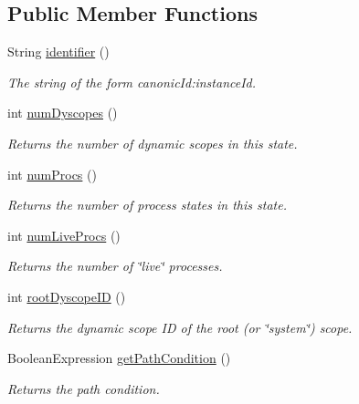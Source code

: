 \subsection*{Public Member Functions}
\begin{DoxyCompactItemize}
\item 
String \hyperlink{interfaceedu_1_1udel_1_1cis_1_1vsl_1_1civl_1_1state_1_1IF_1_1State_a0f39b4dd994e588d9c6d371e1bc7ec95}{identifier} ()
\begin{DoxyCompactList}\small\item\em The string of the form canonic\+Id\+:instance\+Id. \end{DoxyCompactList}\item 
int \hyperlink{interfaceedu_1_1udel_1_1cis_1_1vsl_1_1civl_1_1state_1_1IF_1_1State_a26c87296927d9183e682fc2f1498419d}{num\+Dyscopes} ()
\begin{DoxyCompactList}\small\item\em Returns the number of dynamic scopes in this state. \end{DoxyCompactList}\item 
int \hyperlink{interfaceedu_1_1udel_1_1cis_1_1vsl_1_1civl_1_1state_1_1IF_1_1State_a1fb9bc3c57e059c2885a73ba4d08b441}{num\+Procs} ()
\begin{DoxyCompactList}\small\item\em Returns the number of process states in this state. \end{DoxyCompactList}\item 
int \hyperlink{interfaceedu_1_1udel_1_1cis_1_1vsl_1_1civl_1_1state_1_1IF_1_1State_a9c8021bfb042fb76cba67a223c3df39c}{num\+Live\+Procs} ()
\begin{DoxyCompactList}\small\item\em Returns the number of \char`\"{}live\char`\"{} processes. \end{DoxyCompactList}\item 
int \hyperlink{interfaceedu_1_1udel_1_1cis_1_1vsl_1_1civl_1_1state_1_1IF_1_1State_a7b1945673b73092026e36841342c0332}{root\+Dyscope\+I\+D} ()
\begin{DoxyCompactList}\small\item\em Returns the dynamic scope I\+D of the root (or \char`\"{}system\char`\"{}) scope. \end{DoxyCompactList}\item 
Boolean\+Expression \hyperlink{interfaceedu_1_1udel_1_1cis_1_1vsl_1_1civl_1_1state_1_1IF_1_1State_a5c981340454bb37fa750d0e1900138e5}{get\+Path\+Condition} ()
\begin{DoxyCompactList}\small\item\em Returns the path condition. \end{DoxyCompactList}\item 

\end{DoxyCompactItemize}

